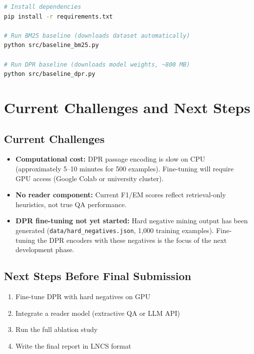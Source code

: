 \documentclass[12pt,a4paper]{article}
\begin{document}
\begin{lstlisting}[language=bash]
# Install dependencies
pip install -r requirements.txt

# Run BM25 baseline (downloads dataset automatically)
python src/baseline_bm25.py

# Run DPR baseline (downloads model weights, ~800 MB)
python src/baseline_dpr.py
\end{lstlisting}


\section{Current Challenges and Next Steps}

\subsection*{Current Challenges}

\begin{itemize}[noitemsep]
    \item \textbf{Computational cost:} DPR passage encoding is slow on CPU
          (approximately 5--10 minutes for 500 examples). Fine-tuning will require
          GPU access (Google Colab or university cluster).
    \item \textbf{No reader component:} Current F1/EM scores reflect retrieval-only
          heuristics, not true QA performance.
    \item \textbf{DPR fine-tuning not yet started:} Hard negative mining output
          has been generated (\texttt{data/hard\_negatives.json}, 1{,}000 training
          examples). Fine-tuning the DPR encoders with these negatives is the focus
          of the next development phase.
\end{itemize}

\subsection*{Next Steps Before Final Submission}

\begin{enumerate}[noitemsep]
    \item Fine-tune DPR with hard negatives on GPU
    \item Integrate a reader model (extractive QA or LLM API)
    \item Run the full ablation study
    \item Write the final report in LNCS format
\end{enumerate}
\end{document}
